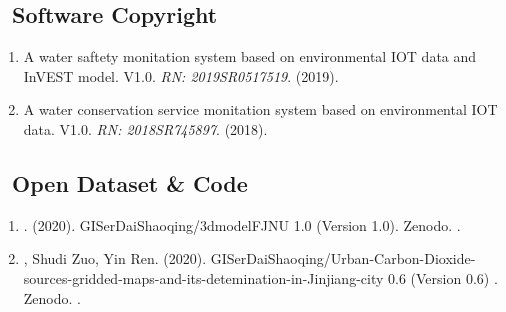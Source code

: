 \subsection*{\texorpdfstring{\faBook\ Software Copyright}{Software Copyright}}
\begin{enumerate}
\item
    A water saftety monitation system based on environmental IOT data and InVEST model. V1.0.
    \textit{RN: 2019SR0517519}. (2019).
\item
    A water conservation service monitation system based on environmental IOT data. V1.0.
    \textit{RN: 2018SR745897}. (2018).
\end{enumerate}

\subsection*{\texorpdfstring{\faBook\ Open Dataset \& Code}{Open Dataset \& Code}}
\begin{enumerate}
\item
   \Shaoqing. (2020).
    GISerDaiShaoqing/3dmodelFJNU 1.0 (Version 1.0). Zenodo. 
    .
\item
   \Shaoqing, Shudi Zuo, Yin Ren. (2020).
    GISerDaiShaoqing/Urban-Carbon-Dioxide-sources-gridded-maps-and-its-detemination-in-Jinjiang-city 0.6 (Version 0.6) . Zenodo. 
    .
\end{enumerate}

